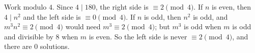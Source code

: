 Work modulo $4$. Since $4\mid180$, the right side is $\equiv2\pmod4$. If $n$ is even, then $4\mid n^2$ and the left side is $\equiv0\pmod4$. If $n$ is odd, then $n^2$ is odd, and $m^3n^2\equiv2\pmod4$ would need $m^3\equiv2\pmod 4$; but $m^3$ is odd when $m$ is odd and divisible by $8$ when $m$ is even. So the left side is never $\equiv2\pmod4$, and there are $\boxed{0}$ solutions.

